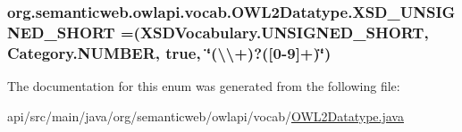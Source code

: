 \hypertarget{enumorg_1_1semanticweb_1_1owlapi_1_1vocab_1_1_o_w_l2_datatype_a3aecab69853f41754fc6c8d0a1e4800d}{
\subsubsection[{X\-S\-D\-\_\-\-U\-N\-S\-I\-G\-N\-E\-D\-\_\-\-S\-H\-O\-R\-T}]{\setlength{\rightskip}{0pt plus 5cm}org.\-semanticweb.\-owlapi.\-vocab.\-O\-W\-L2\-Datatype.\-X\-S\-D\-\_\-\-U\-N\-S\-I\-G\-N\-E\-D\-\_\-\-S\-H\-O\-R\-T =({\bf X\-S\-D\-Vocabulary.\-U\-N\-S\-I\-G\-N\-E\-D\-\_\-\-S\-H\-O\-R\-T}, {\bf Category.\-N\-U\-M\-B\-E\-R}, true, \char`\"{}(\textbackslash{}\textbackslash{}+)?(\mbox{[}0-\/9\mbox{]}+)\char`\"{})}}\label{enumorg_1_1semanticweb_1_1owlapi_1_1vocab_1_1_o_w_l2_datatype_a3aecab69853f41754fc6c8d0a1e4800d}


The documentation for this enum was generated from the following file\-:\begin{DoxyCompactItemize}
\item 
api/src/main/java/org/semanticweb/owlapi/vocab/\hyperlink{_o_w_l2_datatype_8java}{O\-W\-L2\-Datatype.\-java}\end{DoxyCompactItemize}
